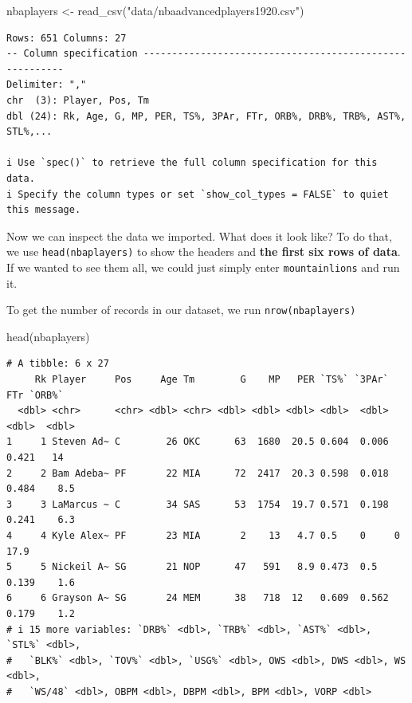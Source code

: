 \documentclass[
  letterpaper,
  DIV=11,
  numbers=noendperiod]{scrreprt}
\newenvironment{Shaded}{\begin{snugshade}}{\end{snugshade}}
\newcommand{\FunctionTok}[1]{\textcolor[rgb]{0.28,0.35,0.67}{#1}}
\newcommand{\NormalTok}[1]{\textcolor[rgb]{0.00,0.23,0.31}{#1}}
\newcommand{\OtherTok}[1]{\textcolor[rgb]{0.00,0.23,0.31}{#1}}
\newcommand{\StringTok}[1]{\textcolor[rgb]{0.13,0.47,0.30}{#1}}
\begin{document}
\begin{Shaded}
\begin{Highlighting}[]
\NormalTok{nbaplayers }\OtherTok{\textless{}{-}} \FunctionTok{read\_csv}\NormalTok{(}\StringTok{"data/nbaadvancedplayers1920.csv"}\NormalTok{)}
\end{Highlighting}
\end{Shaded}

\begin{verbatim}
Rows: 651 Columns: 27
-- Column specification --------------------------------------------------------
Delimiter: ","
chr  (3): Player, Pos, Tm
dbl (24): Rk, Age, G, MP, PER, TS%, 3PAr, FTr, ORB%, DRB%, TRB%, AST%, STL%,...

i Use `spec()` to retrieve the full column specification for this data.
i Specify the column types or set `show_col_types = FALSE` to quiet this message.
\end{verbatim}

Now we can inspect the data we imported. What does it look like? To do
that, we use \texttt{head(nbaplayers)} to show the headers and
\textbf{the first six rows of data}. If we wanted to see them all, we
could just simply enter \texttt{mountainlions} and run it.

To get the number of records in our dataset, we run
\texttt{nrow(nbaplayers)}

\begin{Shaded}
\begin{Highlighting}[]
\FunctionTok{head}\NormalTok{(nbaplayers)}
\end{Highlighting}
\end{Shaded}

\begin{verbatim}
# A tibble: 6 x 27
     Rk Player     Pos     Age Tm        G    MP   PER `TS%` `3PAr`   FTr `ORB%`
  <dbl> <chr>      <chr> <dbl> <chr> <dbl> <dbl> <dbl> <dbl>  <dbl> <dbl>  <dbl>
1     1 Steven Ad~ C        26 OKC      63  1680  20.5 0.604  0.006 0.421   14  
2     2 Bam Adeba~ PF       22 MIA      72  2417  20.3 0.598  0.018 0.484    8.5
3     3 LaMarcus ~ C        34 SAS      53  1754  19.7 0.571  0.198 0.241    6.3
4     4 Kyle Alex~ PF       23 MIA       2    13   4.7 0.5    0     0       17.9
5     5 Nickeil A~ SG       21 NOP      47   591   8.9 0.473  0.5   0.139    1.6
6     6 Grayson A~ SG       24 MEM      38   718  12   0.609  0.562 0.179    1.2
# i 15 more variables: `DRB%` <dbl>, `TRB%` <dbl>, `AST%` <dbl>, `STL%` <dbl>,
#   `BLK%` <dbl>, `TOV%` <dbl>, `USG%` <dbl>, OWS <dbl>, DWS <dbl>, WS <dbl>,
#   `WS/48` <dbl>, OBPM <dbl>, DBPM <dbl>, BPM <dbl>, VORP <dbl>
\end{verbatim}
\end{document}
